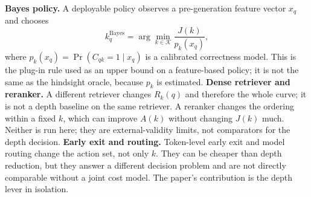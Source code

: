 \documentclass[a4paper,fleqn]{cas-sc}
\begin{document}
\textbf{Bayes policy.} A deployable policy observes a pre-generation feature vector $x_{q}$ and chooses
\begin{equation}\label{eq:bayes-policy}
  k_{q}^{\mathrm{Bayes}}=\arg\min_{k\in\mathcal{K}}\frac{J(k)}{p_{k}(x_{q})},
\end{equation}
where $p_{k}(x_{q})=\Pr(C_{qk}=1\mid x_{q})$ is a calibrated correctness model. This is the plug-in rule used as an upper bound on a feature-based policy; it is not the same as the hindsight oracle, because $p_{k}$ is estimated. \textbf{Dense retriever and reranker.} A different retriever changes $R_{k}(q)$ and therefore the whole curve; it is not a depth baseline on the same retriever. A reranker changes the ordering within a fixed $k$, which can improve $A(k)$ without changing $J(k)$ much. Neither is run here; they are external-validity limits, not comparators for the depth decision. \textbf{Early exit and routing.} Token-level early exit and model routing change the action set, not only $k$. They can be cheaper than depth reduction, but they answer a different decision problem and are not directly comparable without a joint cost model. The paper's contribution is the depth lever in isolation.
\end{document}
